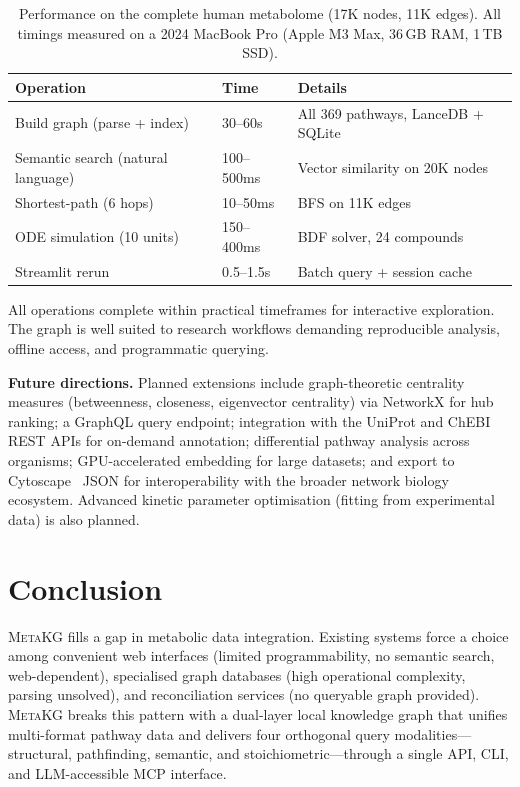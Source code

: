 \documentclass[10pt]{article}
\begin{document}
\begin{table}[H]
  \centering
  \caption{Performance on the complete human metabolome (17K nodes, 11K edges).
  All timings measured on a 2024 MacBook Pro (Apple M3 Max, 36\,GB RAM, 1\,TB SSD).}
  \label{tab:performance}
  \small
  \begin{tabular}{@{}lll@{}}
    \toprule
    Operation & Time & Details \\
    \midrule
    Build graph (parse + index) & 30--60s & All 369 pathways, LanceDB + SQLite \\
    Semantic search (natural language) & 100--500ms & Vector similarity on 20K nodes \\
    Shortest-path (6 hops) & 10--50ms & BFS on 11K edges \\
    ODE simulation (10 units) & 150--400ms & BDF solver, 24 compounds \\
    Streamlit rerun & 0.5--1.5s & Batch query + session cache \\
    \bottomrule
  \end{tabular}
\end{table}

All operations complete within practical timeframes for interactive
exploration. The graph is well suited to research workflows demanding
reproducible analysis, offline access, and programmatic querying.

\textbf{Future directions.} Planned extensions include graph-theoretic
centrality measures (betweenness, closeness, eigenvector centrality) via
NetworkX for hub ranking; a GraphQL query endpoint; integration with the
UniProt and ChEBI REST APIs for on-demand annotation; differential pathway
analysis across organisms; GPU-accelerated embedding for large datasets; and
export to Cytoscape~\citep{shannon2003cytoscape} JSON for interoperability
with the broader network biology ecosystem. Advanced kinetic parameter
optimisation (fitting from experimental data) is also planned.

\section{Conclusion}
\label{sec:conclusion}

\textsc{MetaKG} fills a gap in metabolic data integration. Existing systems
force a choice among convenient web interfaces (limited programmability, no
semantic search, web-dependent), specialised graph databases (high operational
complexity, parsing unsolved), and reconciliation services (no queryable graph
provided). \textsc{MetaKG} breaks this pattern with a dual-layer local
knowledge graph that unifies multi-format pathway data and delivers four
orthogonal query modalities---structural, pathfinding, semantic, and
stoichiometric---through a single API, CLI, and LLM-accessible MCP interface.
\end{document}
